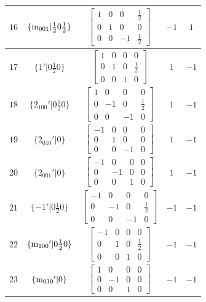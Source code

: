 \documentclass[fleqn,8pt]{jsarticle}
\begin{document}
\begin{longtable}{ccccc}
$ 16 $ & $ \{{\rm m}_{001}|\frac{1}{2} 0 \frac{1}{2}\} $ & $ \begin{bmatrix} 1 & 0 & 0 & \frac{1}{2} \\ 0 & 1 & 0 & 0 \\ 0 & 0 & -1 & \frac{1}{2} \end{bmatrix} $ & $ -1 $ & $ 1 $ \\ \hline
$ 17 $ & $ \{1{}'|0 \frac{1}{2} 0\} $ & $ \begin{bmatrix} 1 & 0 & 0 & 0 \\ 0 & 1 & 0 & \frac{1}{2} \\ 0 & 0 & 1 & 0 \end{bmatrix} $ & $ 1 $ & $ -1 $ \\ \hline
$ 18 $ & $ \{2{}_{100}{}'|0 \frac{1}{2} 0\} $ & $ \begin{bmatrix} 1 & 0 & 0 & 0 \\ 0 & -1 & 0 & \frac{1}{2} \\ 0 & 0 & -1 & 0 \end{bmatrix} $ & $ 1 $ & $ -1 $ \\ \hline
$ 19 $ & $ \{2{}_{010}{}'|0\} $ & $ \begin{bmatrix} -1 & 0 & 0 & 0 \\ 0 & 1 & 0 & 0 \\ 0 & 0 & -1 & 0 \end{bmatrix} $ & $ 1 $ & $ -1 $ \\ \hline
$ 20 $ & $ \{2{}_{001}{}'|0\} $ & $ \begin{bmatrix} -1 & 0 & 0 & 0 \\ 0 & -1 & 0 & 0 \\ 0 & 0 & 1 & 0 \end{bmatrix} $ & $ 1 $ & $ -1 $ \\ \hline
$ 21 $ & $ \{-1{}'|0 \frac{1}{2} 0\} $ & $ \begin{bmatrix} -1 & 0 & 0 & 0 \\ 0 & -1 & 0 & \frac{1}{2} \\ 0 & 0 & -1 & 0 \end{bmatrix} $ & $ -1 $ & $ -1 $ \\ \hline
$ 22 $ & $ \{{\rm m}_{100}{}'|0 \frac{1}{2} 0\} $ & $ \begin{bmatrix} -1 & 0 & 0 & 0 \\ 0 & 1 & 0 & \frac{1}{2} \\ 0 & 0 & 1 & 0 \end{bmatrix} $ & $ -1 $ & $ -1 $ \\ \hline
$ 23 $ & $ \{{\rm m}_{010}{}'|0\} $ & $ \begin{bmatrix} 1 & 0 & 0 & 0 \\ 0 & -1 & 0 & 0 \\ 0 & 0 & 1 & 0 \end{bmatrix} $ & $ -1 $ & $ -1 $ \\ \hline

\end{longtable}
\end{document}
